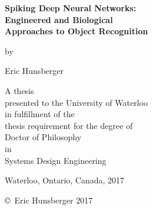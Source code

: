 \pagestyle{empty}

\begin{titlepage}
  \begin{center}
  \vspace*{1.0cm}

  \Huge
  {\bf Spiking Deep Neural Networks:\\Engineered and Biological\\Approaches to Object Recognition}

  \vspace*{1.0cm}

  \normalsize
  by \\

  \vspace*{1.0cm}

  \Large
  Eric Hunsberger \\

  \vfill

  \normalsize
  A thesis \\
  presented to the University of Waterloo \\
  in fulfillment of the \\
  thesis requirement for the degree of \\
  Doctor of Philosophy \\
  in \\
  Systems Design Engineering \\

  \vspace*{2.0cm}

  Waterloo, Ontario, Canada, 2017 \\

  \vspace*{1.0cm}

  \copyright\ Eric Hunsberger 2017 \\
  \end{center}
\end{titlepage}

